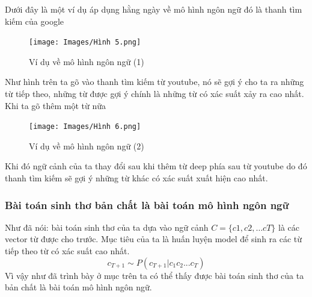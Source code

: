 \documentclass[a4paper]{article}
\theoremstyle{definition}
\begin{document}
Dưới đây là một ví dụ áp dụng hằng ngày về mô hình ngôn ngữ đó là thanh tìm kiếm của google
\newpage
\begin{figure}[h!]
\begin{center}
\texttt{[image: Images/Hình 5.png]} \\[0.2in]

\caption{Ví dụ về mô hình ngôn ngữ (1)}
\end{center}
\end{figure}

Như hình trên ta gõ vào thanh tìm kiếm từ youtube, nó sẽ gợi ý cho ta ra những từ tiếp theo, những từ được gợi ý chính là những từ có xác suất xảy ra cao nhất. Khi ta gõ thêm một từ nữa 
\begin{figure}[h!]
\begin{center}
\texttt{[image: Images/Hình 6.png]} \\[0.2in]

\caption{Ví dụ về mô hình ngôn ngữ (2)}
\end{center}
\end{figure}
Khi đó ngữ cảnh của ta thay đổi sau khi thêm từ deep phía sau từ youtube do đó thanh tìm kiếm sẽ gợi ý những từ khác có xác suất xuất hiện cao nhất.
\subsubsection{Bài toán sinh thơ bản chất là bài toán mô hình ngôn ngữ}
Như đã nói: bài toán sinh thơ của ta dựa vào ngữ cảnh $C = \{c1, c2, …cT\}$ là các vector từ được cho trước. Mục tiêu của ta là huấn luyện model để sinh ra các từ tiếp theo từ có xác suất cao nhất. 
$$c_{T+1} \sim P(c_{T+1}|c_1c_2...c_T)$$
Vì vậy như đã trình bày ở mục trên ta có thể thấy được bài toán sinh thơ của ta  bản chất là bài toán mô hình ngôn ngữ.
\newpage
\end{document}

